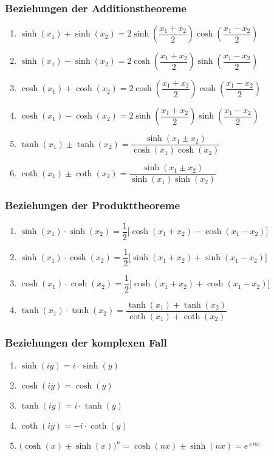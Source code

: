 \subsubsection{Beziehungen der Additionstheoreme}
\begin{enumerate}[$(a)$]
\item $\sinh\left(x_1\right)+\sinh\left(x_2\right)=2\sinh\left(\dfrac{x_1+x_2}{2}\right)\cosh\left(\dfrac{x_1-x_2}{2}\right)$
\item $\sinh\left(x_1\right)-\sinh\left(x_2\right)=2\cosh\left(\dfrac{x_1+x_2}{2}\right)\sinh\left(\dfrac{x_1-x_2}{2}\right)$
\item $\cosh\left(x_1\right)+\cosh\left(x_2\right)=2\cosh\left(\dfrac{x_1+x_2}{2}\right)\cosh\left(\dfrac{x_1-x_2}{2}\right)$
\item $\cosh\left(x_1\right)-\cosh\left(x_2\right)=2\sinh\left(\dfrac{x_1+x_2}{2}\right)\sinh\left(\dfrac{x_1-x_2}{2}\right)$
\item $\tanh\left(x_1\right)\pm\tanh\left(x_2\right)=\dfrac{\sinh\left(x_1\pm x_2\right)}{\cosh\left(x_1\right)\cosh\left(x_2\right)}$
\item $\coth\left(x_1\right)\pm\coth\left(x_2\right)=\dfrac{\sinh\left(x_1\pm x_2\right)}{\sinh\left(x_1\right)\sinh\left(x_2\right)}$
\end{enumerate}
\subsubsection{Beziehungen der Produkttheoreme}
\begin{enumerate}[$(a)$]
\item $\sinh\left(x_1\right)\cdot \sinh\left(x_2\right)=\dfrac{1}{2}\Big[\cosh\left(x_1+x_2\right)-\cosh\left(x_1-x_2\right)\Big]$
\item $\sinh\left(x_1\right)\cdot\cosh\left(x_2\right)=\dfrac{1}{2}\Big[\sinh\left(x_1+x_2\right)+\sinh\left(x_1-x_2\right)\Big]$
\item $\cosh\left(x_1\right)\cdot \cosh\left(x_2\right)=\dfrac{1}{2}\Big[\cosh\left(x_1+x_2\right)+\cosh\left(x_1-x_2\right)\Big]$
\item $\tanh\left(x_1\right)\cdot \tanh\left(x_2\right)=\dfrac{\tanh\left(x_1\right)+\tanh\left(x_2\right)}{\coth\left(x_1\right)+\coth\left(x_2\right)}$
\end{enumerate}
\subsubsection{Beziehungen der komplexen Fall}
\begin{enumerate}[$(a)$]
\item $\sinh\left(iy\right)=i\cdot \sinh\left(y\right)$ 
\item $\cosh\left(iy\right)=\cosh\left(y\right)$ 
\item $\tanh\left(iy\right)=i\cdot \tanh\left(y\right)$ 
\item $\coth\left(iy\right)=-i\cdot \coth\left(y\right)$ 
\item $\Big(\cosh\left(x\right)\pm \sinh\left(x\right)\Big)^n=\cosh\left(nx\right)\pm \sinh\left(nx\right)=e^{\pm nx}$
\end{enumerate}
